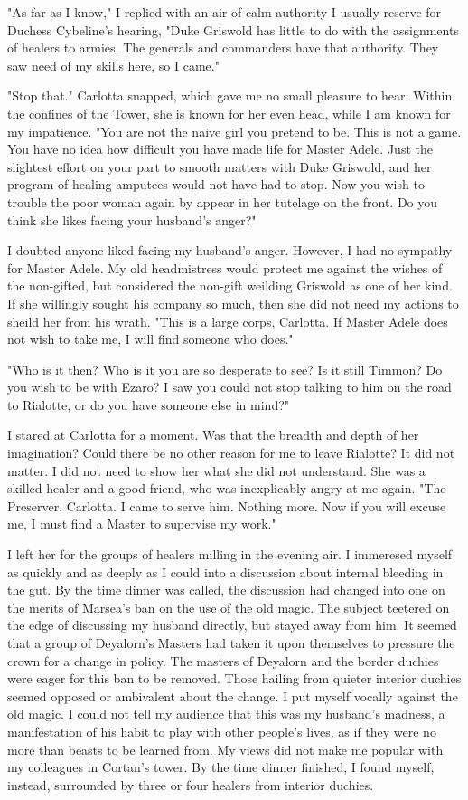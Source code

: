\documentclass{article}
\begin{document}
"As far as I know," I replied with an air of calm authority I usually reserve for Duchess Cybeline's hearing, "Duke Griswold has little to do with the assignments of healers to armies. The generals and commanders have that authority. They saw need of my skills here, so I came."

"Stop that." Carlotta snapped, which gave me no small pleasure to hear. Within the confines of the Tower, she is known for her even head, while I am known for my impatience. "You are not the naive girl you pretend to be. This is not a game. You have no idea how difficult you have made life for Master Adele. Just the slightest effort on your part to smooth matters with Duke Griswold, and her program of healing amputees would not have had to stop. Now you wish to trouble the poor woman again by appear in her tutelage on the front. Do you think she likes facing your husband's anger?"

I doubted anyone liked facing my husband's anger. However, I had no sympathy for Master Adele. My old headmistress would protect me against the wishes of the non-gifted, but considered the non-gift weilding Griswold as one of her kind. If she willingly sought his company so much, then she did not need my actions to sheild her from his wrath. "This is a large corps, Carlotta. If Master Adele does not wish to take me, I will find someone who does."

"Who is it then? Who is it you are so desperate to see? Is it still Timmon? Do you wish to be with Ezaro? I saw you could not stop talking to him on the road to Rialotte, or do you have someone else in mind?"

I stared at Carlotta for a moment. Was that the breadth and depth of her imagination? Could there be no other reason for me to leave Rialotte? It did not matter. I did not need to show her what she did not understand. She was a skilled healer and a good friend, who was inexplicably angry at me again. "The Preserver, Carlotta. I came to serve him. Nothing more. Now if you will excuse me, I must find a Master to supervise my work." 

I left her for the groups of healers milling in the evening air. I immeresed myself as quickly and as deeply as I could into a discussion about internal bleeding in the gut. By the time dinner was called, the discussion had changed into one on the merits of Marsea's ban on the use of the old magic. The subject teetered on the edge of discussing my husband directly, but stayed away from him. It seemed that a group of Deyalorn's Masters had taken it upon themselves to pressure the crown for a change in policy. The masters of Deyalorn and the border duchies were eager for this ban to be removed. Those hailing from quieter interior duchies seemed opposed or ambivalent about the change. I put myself vocally against the old magic. I could not tell my audience that this was my husband's madness, a manifestation of his habit to play with other people's lives, as if they were no more than beasts to be learned from. My views did not make me popular with my colleagues in Cortan's tower. By the time dinner finished, I found myself, instead, surrounded by three or four healers from interior duchies. 
\end{document}
